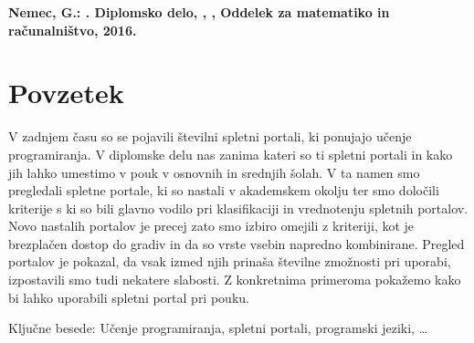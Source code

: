 \textbf{Nemec, G.: \podnaslov. Diplomsko delo, \univerza, \fakulteta,
Oddelek za matematiko in računalništvo, 2016.}

\section*{Povzetek}
\label{sec:povzetek}

V zadnjem času so se pojavili številni spletni portali, ki ponujajo
učenje programiranja. V diplomske delu nas zanima kateri so ti spletni
portali in kako jih lahko umestimo v pouk v osnovnih in srednjih
šolah. V ta namen smo pregledali spletne portale, ki so nastali v
akademskem okolju ter smo določili kriterije s ki so bili glavno
vodilo pri klasifikaciji in vrednotenju spletnih portalov. Novo
nastalih portalov je precej zato smo izbiro omejili z kriteriji, kot
je brezplačen dostop do gradiv in da so vrste vsebin napredno
kombinirane. Pregled portalov je pokazal, da vsak izmed njih prinaša
številne zmožnosti pri uporabi, izpostavili smo tudi nekatere
slabosti. Z konkretnima primeroma pokažemo kako bi lahko uporabili
spletni portal pri pouku. 


Ključne besede: Učenje programiranja, spletni portali, programski
jeziki, \dots

